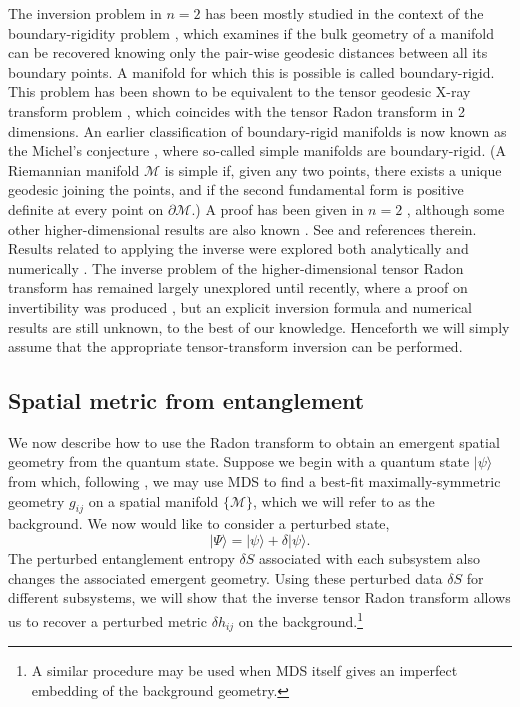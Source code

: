\documentclass[%
12pt,preprint,
nofootinbib,
amsmath,amssymb,
aps,
prd,
showpacs,
superscriptaddress
]{revtex4-2}
\begin{document}
The inversion problem in $n=2$ has been mostly studied in the context of the boundary-rigidity problem  \cite{BRPrev1,Stefanov2008}, which examines if the bulk geometry of a manifold can be recovered knowing only the pair-wise geodesic distances between all its boundary points. A manifold for which this is possible is called boundary-rigid. 
This problem has been shown \cite{sharafutdinov1994integral} to be equivalent to the tensor geodesic X-ray transform problem \cite{john1938,sharafutdinov1994integral, Stefanov2008}, which coincides with the tensor Radon transform in 2 dimensions. An earlier classification of boundary-rigid manifolds is now known as the Michel's conjecture \cite{michel}, where so-called simple manifolds are boundary-rigid. (A Riemannian manifold $\mathcal{M}$ is simple if, given any two points, there exists a unique geodesic joining the points, and if the second fundamental form is positive definite at every point on $\partial\mathcal{M}$.) A proof has been given in $n=2$ \cite{BRP2dproof}, although some other higher-dimensional results are also known \cite{BRPflat}. See  \cite{Stefanov2008,BRPrev2,Croke2004} and references therein. Results related to applying the inverse were explored both analytically \cite{Sharafutdinov2007,Stefanov2014} and numerically \cite{Monard}. 
The inverse problem of the higher-dimensional tensor Radon transform has remained largely unexplored until recently, where a proof on invertibility was produced \cite{uhlmann}, but an explicit inversion formula and numerical results are still unknown, to the best of our knowledge. 
Henceforth we will simply assume that the appropriate tensor-transform inversion can be performed.


\subsection{Spatial metric from entanglement}

We now describe how to use the Radon transform to obtain an emergent spatial geometry from the quantum state.
Suppose we begin with a quantum state $|\psi\rangle$ from which, following \cite{Cao:2016mst}, we may use MDS to find a best-fit maximally-symmetric geometry $g_{ij}$ on a spatial manifold $\{\mathcal{M}\}$, which we will refer to as the background.
We now would like to consider a perturbed state,
\begin{equation}
  |\Psi\rangle = |\psi\rangle + \delta |\psi\rangle.
\end{equation}
The perturbed entanglement entropy $\delta S$ associated with each subsystem also changes the associated emergent geometry. 
Using these perturbed data $\delta S$ for different subsystems, we will show that the inverse tensor Radon transform allows us to recover a perturbed metric $\delta h_{ij}$ on the background.\footnote{A similar procedure may be used when MDS itself gives an imperfect embedding of the background geometry.}  
\end{document}
